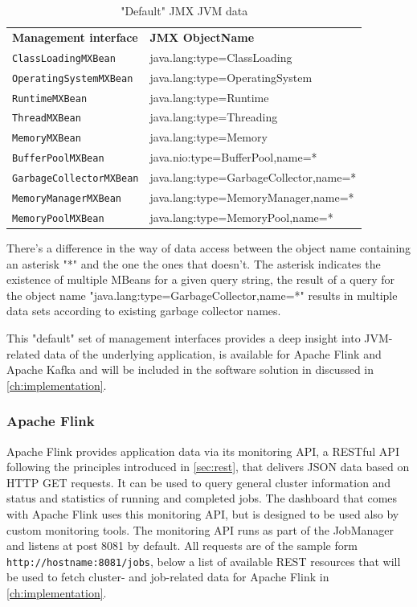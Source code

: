 \begin{table}[H]
    \begin{tabular}{ll}
        \textbf{Management interface} & \textbf{JMX ObjectName} \\
        \verb|ClassLoadingMXBean| & java.lang:type=ClassLoading \\
        \verb|OperatingSystemMXBean| & java.lang:type=OperatingSystem \\
        \verb|RuntimeMXBean| & java.lang:type=Runtime \\
        \verb|ThreadMXBean| & java.lang:type=Threading \\
        \verb|MemoryMXBean| & java.lang:type=Memory \\
        \verb|BufferPoolMXBean|& java.nio:type=BufferPool,name=* \\
        \verb|GarbageCollectorMXBean| & java.lang:type=GarbageCollector,name=* \\
        \verb|MemoryManagerMXBean| & java.lang:type=MemoryManager,name=* \\
        \verb|MemoryPoolMXBean| & java.lang:type=MemoryPool,name=* \\
    \end{tabular}
    \caption{"Default" JMX JVM data}
    \label{tbl:jmxjvmdata}
\end{table}

There's a difference in the way of data access between the object name containing an asterisk "*"
and the one the ones that doesn't. The asterisk indicates the existence of multiple MBeans for a given query string,
the result of a query for the object name "java.lang:type=GarbageCollector,name=*" results in multiple data sets according
to existing garbage collector names.

This "default" set of management interfaces provides a deep insight into JVM-related data of the underlying application, is
available for Apache Flink and Apache Kafka and will be included in the software solution
in discussed in \autoref{ch:implementation}.

\subsubsection{Apache Flink}

Apache Flink provides application data via its monitoring API, a RESTful API following the principles introduced in \autoref{sec:rest},
 that delivers JSON data based on HTTP
GET requests. It can be used to query general cluster information and status and
statistics of running and completed jobs. The dashboard that comes with Apache Flink
uses this monitoring API, but is designed to be used also by custom monitoring tools. The
monitoring API runs as part of the JobManager and listens at post 8081 by default. All requests
are of the sample form \verb|http://hostname:8081/jobs|, below a list of available REST resources that
will be used to fetch cluster- and job-related data for Apache Flink in \autoref{ch:implementation}.

